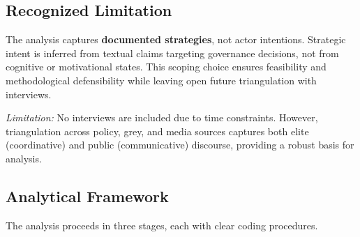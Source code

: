 \subsection*{Recognized Limitation}

The analysis captures \textbf{documented strategies}, not actor intentions. Strategic 
intent is inferred from textual claims targeting governance decisions, not from 
cognitive or motivational states. This scoping choice ensures feasibility and 
methodological defensibility while leaving open future triangulation with interviews.

\textit{Limitation:} No interviews are included due to time constraints. However, 
triangulation across policy, grey, and media sources captures both elite 
(coordinative) and public (communicative) discourse, providing a robust basis for 
analysis.   


\subsection*{Analytical Framework}
The analysis proceeds in three stages, each with clear coding procedures.

